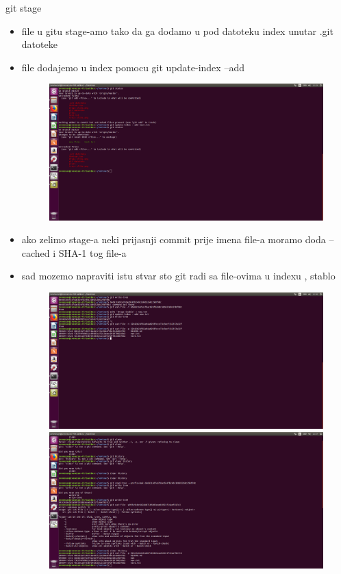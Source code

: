 \documentclass[]{beamer}
\begin{document}
\begin{frame}{git stage}

\begin{itemize}
	\item file u gitu stage-amo tako da ga dodamo u pod datoteku index unutar .git datoteke
	\item file dodajemo u index pomocu git update-index --add
	\begin{figure}
		\centering
	\includegraphics[scale=.48]{./slike/cetvrta_slika.jpg}
	\end{figure}
	\item ako zelimo stage-a neki prijasnji commit prije imena file-a moramo doda --cached i SHA-1 tog file-a
	\item sad mozemo napraviti istu stvar sto git radi sa file-ovima u indexu , stablo
	\begin{figure}
		\centering
	\includegraphics[scale=.48]{./slike/peta_slika.jpg}
	\includegraphics[scale=.48]{./slike/sesta_slika.jpg}
	\end{figure}
		
\end{itemize}


\end{frame}
\end{document}
